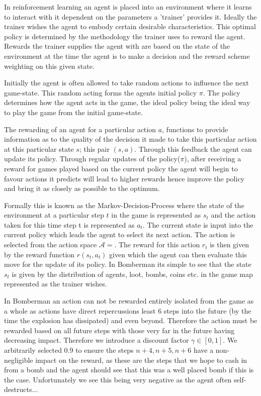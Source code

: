 In reinforcement learning an agent is placed into an environment where it learns to interact with it dependent on the parameters a 'trainer' provides it. Ideally the trainer wishes the agent to embody certain desirable characteristics. This optimal policy is determined by the methodology the trainer uses to reward the agent. Rewards the trainer supplies the agent with are based on the state of the environment at the time the agent is to make a decision and the reward scheme weighting on this given state. 

Initially the agent is often allowed to take random actions to influence the next game-state. This random acting forms the agents initial policy $\pi$. The policy determines how the agent acts in the game, the ideal policy being the ideal way to play the game from the initial game-state.

The rewarding of an agent for a particular action $a$, functions to provide information as to the quality of the decision it made to take this particular action at this particular state $s$; this  pair $(s, a)$. Through this feedback the agent can update its policy. Through regular updates of the policy($\pi$), after receiving a reward for games played based on the current policy the agent will begin to favour actions it predicts will lead to higher rewards hence improve the policy and bring it as closely as possible to the optimum.

Formally this is known as the Markov-Decision-Process where the state of the environment at a particular step $t$ in the game is represented as $s_t$ and the action taken for this time step t is represented as $a_t$. The current state is input into the current policy which leads the agent to select its next action. The action is selected from the action space $\mathcal{A} = $. The reward for this action $r_t$ is then given by the reward function $r(s_t, a_t)$ given which the agent can then evaluate this move for the update of its policy. In Bomberman its simple to see that the state $s_t$ is given by the distribution of agents, loot, bombs, coins etc. in the game map represented as the trainer wishes. 

In Bomberman an action can not be rewarded entirely isolated from the game as a whole as actions have direct repercussions least 6 steps into the future (by the time the explosion has dissipated) and even beyond. Therefore the action must be rewarded based on all future steps with those very far in the future having decreasing impact. Therefore we introduce a discount factor $\gamma \in [0, 1]$. We arbitrarily selected 0.9 to ensure the steps $n+4, n+5, n+6$ have a non-negligible impact on the reward, as these are the steps that we hope to cash in from a bomb and the agent should see that this was a well placed bomb if this is the case. Unfortunately we see this being very negative as the agent often self-destructs...


